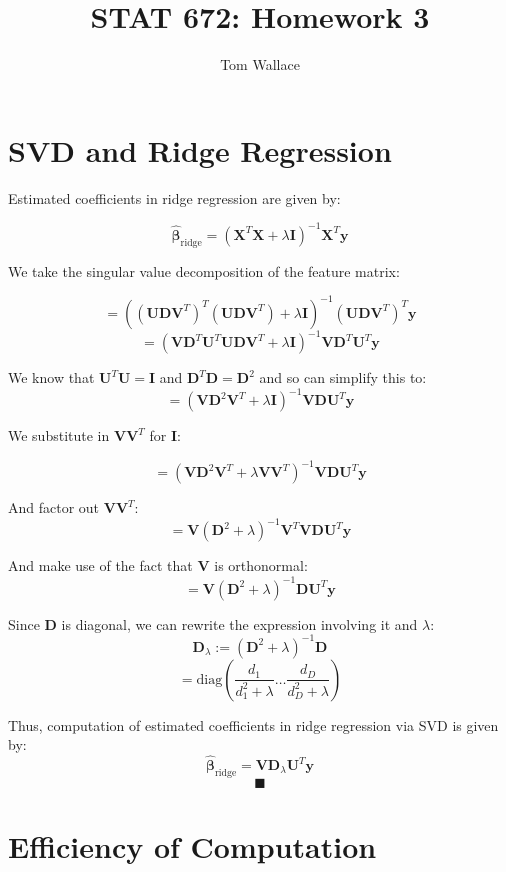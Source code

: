 \documentclass{article}
\title{STAT 672: Homework 3}
\author{Tom Wallace}
\begin{document}
\maketitle

\section*{SVD and Ridge Regression}

Estimated coefficients in ridge regression are given by:

$$
\hat{\bm{\beta}}_{\mathrm{ridge}} = (\mathbf{X}^T\mathbf{X} + \lambda
\mathbf{I})^{-1}\mathbf{X}^T\mathbf{y}
$$

We take the singular value decomposition of the feature matrix:

$$
= ((\mathbf{UDV}^T)^T(\mathbf{UDV}^T)+\lambda \mathbf{I})^{-1} (\mathbf{UDV}^T)^T \mathbf{y}
$$
$$
= (\mathbf{VD}^T\mathbf{U}^T\mathbf{UDV}^T + \lambda \mathbf{I})^{-1}
\mathbf{VD}^T\mathbf{U}^T \mathbf{y}
$$

We know that $\mathbf{U}^T\mathbf{U}=\mathbf{I}$ and $\mathbf{D}^T\mathbf{D}=\mathbf{D}^2$ and so can
simplify this to:
$$
= (\mathbf{VD}^2\mathbf{V}^T + \lambda \mathbf{I})^{-1} \mathbf{VDU}^T\mathbf{y}
$$

We substitute in $\mathbf{VV}^T$ for $\mathbf{I}$:

$$
= (\mathbf{VD}^2\mathbf{V}^T + \lambda \mathbf{VV}^T)^{-1} \mathbf{VDU}^T\mathbf{y}
$$

And factor out $\mathbf{VV}^T$:
$$
= \mathbf{V}(\mathbf{D}^2 + \lambda)^{-1}\mathbf{V}^T \mathbf{VDU}^T\mathbf{y}
$$

And make use of the fact that $\mathbf{V}$ is orthonormal:
$$
= \mathbf{V}(\mathbf{D}^2 + \lambda)^{-1}\mathbf{DU}^T\mathbf{y}
$$

Since $\mathbf{D}$ is diagonal, we can rewrite the expression involving it and
$\lambda$:
$$
\mathbf{D}_\lambda := (\mathbf{D}^2 + \lambda)^{-1}\mathbf{D}
$$
$$
= \mathrm{diag}\left(\frac{d_1}{d_1^2 + \lambda} \ldots \frac{d_D}{d_D^2 +
\lambda} \right)
$$

Thus, computation of estimated coefficients in ridge regression via SVD is
given by:
$$
\hat{\bm{\beta}}_{\mathrm{ridge}} = \mathbf{VD}_\lambda \mathbf{U}^T\mathbf{y}
$$
$$
\blacksquare
$$

\section*{Efficiency of Computation}
\end{document}
